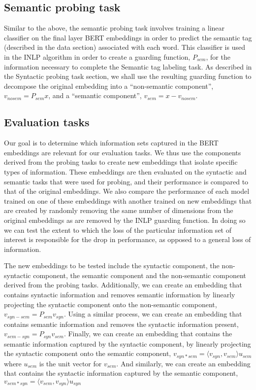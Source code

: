 \documentclass[11pt,a4paper]{article}
\begin{document}
\subsection{Semantic probing task}
\label{sec:semantics}

Similar to the above, the semantic probing task involves training a linear classifier on the final layer BERT embeddings in order to predict the semantic tag (described in the data section) associated with each word. This classifier is used in the INLP algorithm in order to create a guarding function, $P_{sem}$, for the information necessary to complete the Semantic tag labeling task. As described in the Syntactic probing task section, we shall use the resulting guarding function to decompose the original embedding into a ``non-semantic component'', $v_{no sem} = P_{sem} x$, and a ``semantic component'', $v_{sem} = x - v_{no sem}$. 


\subsection{Evaluation tasks}
\label{sec:eval}

Our goal is to determine which information sets captured in the BERT embeddings are relevant for our evaluation tasks. We thus use the components derived from the probing tasks to create new embeddings that isolate specific types of information. These embeddings are then evaluated on the syntactic and semantic tasks that were used for probing, and their performance is compared to that of the original embeddings. We also compare the performance of each model trained on one of these embeddings with another trained on new embeddings that are created by randomly removing the same number of dimensions from the original embeddings as are removed by the INLP guarding function. In doing so we can test the extent to which the loss of the particular information set of interest is responsible for the drop in performance, as opposed to a general loss of information. 

The new embeddings to be tested include the syntactic component, the non-syntactic component, the semantic component and the non-semantic component derived from the probing tasks. Additionally, we can create an embedding that contains syntactic information and removes semantic information by linearly projecting the syntactic component onto the non-semantic component, $v_{syn - sem} = P_{sem} v_{syn}$. Using a similar process, we can create an embedding that contains semantic information and removes the syntactic information present, $v_{sem - syn} = P_{syn} v_{sem}$. Finally, we can create an embedding that contains the semantic information captured by the syntactic component, by linearly projecting the syntactic component onto the semantic component, $v_{syn * sem} = \langle v_{syn} ,v_{sem} \rangle u_{sem}$ where $u_{sem}$ is the unit vector for $v_{sem}$. And similarly, we can create an embedding that contains the syntactic information captured by the semantic component, $v_{sem * syn} = \langle v_{sem} , v_{syn} \rangle  u_{syn}$
\end{document}
